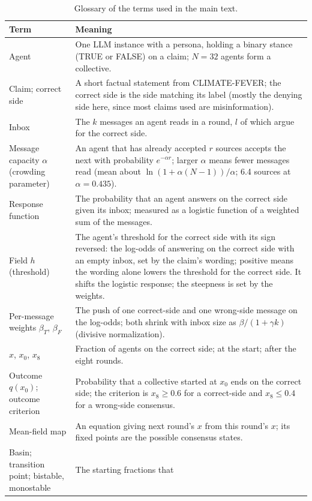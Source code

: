\documentclass[11pt]{article}
\begin{document}
\begin{table}[H]
\caption{Glossary of the terms used in the main text.}
\label{tab:terms}
\small
\begin{tabular}{@{}>{\raggedright\arraybackslash}p{}p{}@{}}
\toprule
Term & Meaning \\
\midrule
Agent & One LLM instance with a persona, holding a binary stance (TRUE or
FALSE) on a claim; $N = 32$ agents form a collective. \\
Claim; correct side & A short factual statement from CLIMATE-FEVER; the
correct side is the side matching its label (mostly the denying side here,
since most claims used are misinformation). \\
Inbox & The $k$ messages an agent reads in a round, $l$ of which argue for
the correct side. \\
Message capacity $\alpha$ (crowding parameter) & An agent that has already
accepted $r$ sources accepts the next with probability $e^{-\alpha r}$;
larger $\alpha$ means fewer messages read (mean about
$\ln(1+\alpha(N-1))/\alpha$; 6.4 sources at $\alpha = 0.435$). \\
Response function & The probability that an agent answers on the correct
side given its inbox; measured as a logistic function of a weighted sum of
the messages. \\
Field $h$ (threshold) & The agent's threshold for the correct side with
its sign reversed: the log-odds of answering on the correct side with an
empty inbox, set by the claim's wording; positive means the wording alone
lowers the threshold for the correct side. It shifts the logistic response;
the steepness is set by the weights. \\
Per-message weights $\beta_T$, $\beta_F$ & The push of one correct-side and
one wrong-side message on the log-odds; both shrink with inbox size as
$\beta/(1+\gamma k)$ (divisive normalization). \\
$x$, $x_0$, $x_8$ & Fraction of agents on the correct side; at the start;
after the eight rounds. \\
Outcome $q(x_0)$; outcome criterion & Probability that a collective
started at $x_0$ ends on the correct side; the criterion is $x_8 \ge 0.6$
for a correct-side and $x_8 \le 0.4$ for a wrong-side consensus. \\
Mean-field map & An equation giving next round's $x$ from this round's $x$;
its fixed points are the possible consensus states. \\
Basin; transition point; bistable, monostable & The starting fractions that

\end{tabular}
\end{table}
\end{document}
